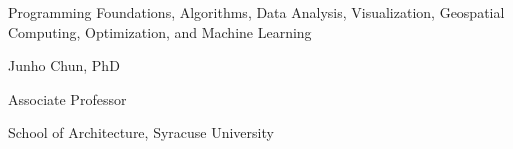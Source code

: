 
\makeatletter
\providecommand{\BookTitle}{\@title}
\providecommand{\BookSubtitle}{Programming Foundations, Algorithms, Data Analysis, Visualization, Geospatial Computing, Optimization, and Machine Learning}
\providecommand{\BookAuthor}{Junho Chun, PhD}
\providecommand{\BookAuthorTitle}{Associate Professor}
\providecommand{\BookAuthorAffiliation}{School of Architecture, Syracuse University}
\providecommand{\BookCourse}{ARC500}
\providecommand{\BookTerm}{Fall 2025}
\providecommand{\BookPublisher}{}
\makeatother

\begin{titlepage}
\thispagestyle{empty}

\vspace*{1.8cm}
\begin{flushleft}
  {\bfseries\fontsize{38}{42}\selectfont \BookTitle\par}
  \vspace{6pt}
  {\color{black!65}\fontsize{14}{18}\selectfont \BookSubtitle\par}
\end{flushleft}

\vfill
\begin{center}
\end{center}
\vfill

\begin{flushleft}
  {\small \BookAuthor}\par
  {\small \BookAuthorTitle}
\end{flushleft}

\begin{flushleft}
  {\small \BookAuthorAffiliation}
\end{flushleft}

\begin{flushright}
  {\small \BookPublisher}
\end{flushright}

\end{titlepage}

